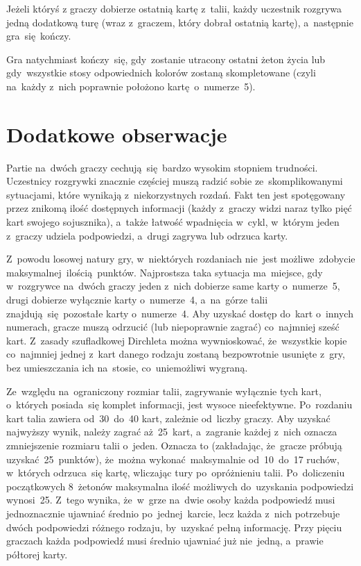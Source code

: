 \documentclass[declaration,shortabstract,inz]{iithesis}
\begin{document}
Jeżeli któryś z graczy dobierze ostatnią kartę z~talii, każdy uczestnik rozgrywa jedną dodatkową turę (wraz z~graczem, który dobrał ostatnią kartę), a~następnie gra~się kończy.

Gra natychmiast kończy~się, gdy~zostanie utracony ostatni żeton życia lub gdy~wszystkie stosy odpowiednich kolorów zostaną skompletowane (czyli na~każdy z~nich poprawnie położono kartę o~numerze~5).

\section{Dodatkowe obserwacje}

Partie na~dwóch graczy cechują~się bardzo wysokim stopniem trudności. Uczestnicy rozgrywki znacznie częściej muszą radzić sobie ze~skomplikowanymi sytuacjami, które wynikają z~niekorzystnych rozdań. Fakt ten jest spotęgowany przez znikomą ilość dostępnych informacji (każdy z~graczy widzi naraz tylko pięć kart swojego sojusznika), a~także łatwość wpadnięcia w~cykl, w~którym jeden z~graczy udziela podpowiedzi, a~drugi zagrywa lub odrzuca karty.

Z~powodu losowej natury gry, w~niektórych rozdaniach nie~jest możliwe zdobycie maksymalnej ilością punktów. Najprostsza taka sytuacja ma~miejsce, gdy w~rozgrywce na~dwóch graczy jeden z~nich dobierze same karty o~numerze~5, drugi dobierze wyłącznie karty o~numerze~4, a~na~górze talii znajdują~się pozostałe karty o~numerze~4. Aby uzyskać dostęp do~kart o~innych numerach, gracze muszą odrzucić (lub niepoprawnie zagrać) co~najmniej sześć kart. Z~zasady szufladkowej Dirchleta można wywnioskować, że~wszystkie kopie co~najmniej jednej z~kart danego rodzaju zostaną bezpowrotnie usunięte z~gry, bez umieszczania ich na~stosie, co~uniemożliwi wygraną.

Ze~względu na~ograniczony rozmiar talii, zagrywanie wyłącznie tych kart, o~których posiada~się komplet informacji, jest wysoce nieefektywne. Po~rozdaniu kart talia zawiera od~30~do~40 kart, zależnie od~liczby graczy. Aby uzyskać najwyższy wynik, należy zagrać aż~25~kart, a~zagranie każdej z~nich oznacza zmniejszenie rozmiaru talii o~jeden. Oznacza to (zakładając, że~gracze próbują uzyskać 25~punktów), że~można wykonać maksymalnie od~10~do~17 ruchów, w~których odrzuca~się kartę, wliczając tury po~opróżnieniu talii. Po~doliczeniu początkowych 8~żetonów maksymalna ilość możliwych do~uzyskania podpowiedzi wynosi~25. Z~tego wynika, że~w~grze na~dwie osoby każda podpowiedź musi jednoznacznie ujawniać średnio po~jednej karcie, lecz każda z~nich potrzebuje dwóch podpowiedzi różnego rodzaju, by~uzyskać pełną informację. Przy pięciu graczach każda podpowiedź musi średnio ujawniać już nie~jedną, a~prawie półtorej karty.
\end{document}
